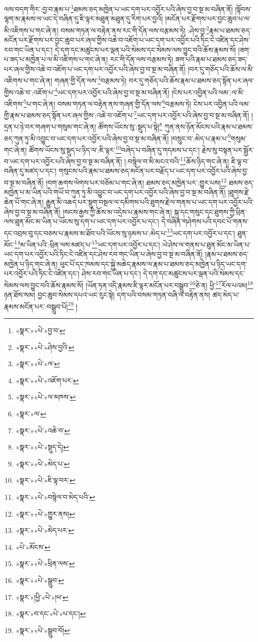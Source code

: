 ལས་བདག་གིར་:བྱ་བ་རྣམ་པ་\footnote{«སྣར་»«པེ་»བྱ་བ་}ཐམས་ཅད་མཁྱེན་པ་ཡང་དག་པར་འབྱོར་པའི་ཞེས་བྱ་བ་སྔ་མ་བཞིན་ནོ། །སྟོབས་ལྷག་མ་རྣམས་ལ་ཡང་དེ་བཞིན་དུ་ཇི་ལྟར་མཐུན་མཐུན་དུ་རིག་པར་བྱའོ། །མངོན་པར་རྫོགས་པར་བྱང་ཆུབ་པ་ལ་མི་འཇིགས་པ་གང་ཞེ་ན། བསམ་གཏན་ལ་བརྟེན་ནས་རང་གི་དོན་ལས་བརྩམས་ཏེ། :ཤེས་བྱ་\footnote{«སྣར་»«པེ་»ཤེས་བྱའི་}རྣམ་པ་ཐམས་ཅད་མངོན་པར་རྫོགས་པར་བྱང་ཆུབ་པར་ཞལ་གྱིས་འཆེ་བ་འཇོག་པ་ཡང་དག་པར་འབྱོར་པའི་ཏིང་ངེ་འཛིན་དང་ཤེས་རབ་གང་ཡིན་པ་དང་། དེ་དག་དང་མཚུངས་པར་ལྡན་པའི་སེམས་དང་སེམས་ལས་བྱུང་བའི་ཆོས་རྣམས་སོ། །ཟག་པ་ཟད་པ་མཁྱེན་པ་ལ་མི་འཇིགས་པ་གང་ཞེ་ན། རང་གི་དོན་ལས་བརྩམས་ཏེ། ཟག་པའི་རྣམ་པ་ཐམས་ཅད་ཟད་པར་ཞལ་གྱིས་འཆེ་བ་འཇོག་པ་ཡང་དག་པར་འབྱོར་པའི་ཞེས་བྱ་བ་སྔ་མ་བཞིན་ནོ། །བར་དུ་གཅོད་པའི་ཆོས་ལ་མི་འཇིགས་པ་གང་ཞེ་ན། གཞན་གྱི་དོན་ལས་\footnote{«སྣར་»«པེ་»ལ་}བརྩམས་ཏེ། བར་དུ་གཅོད་པའི་ཆོས་རྣམ་པ་ཐམས་ཅད་སྟོན་པར་ཞལ་གྱིས་འཆེ་བ་:འཇོག་པ་\footnote{«སྣར་»«པེ་»འཇོག་པར་}ཡང་དག་པར་འབྱོར་པའི་ཞེས་བྱ་བ་སྔ་མ་བཞིན་ནོ། །ངེས་པར་འབྱིན་པའི་ལམ་:ལ་མི་འཇིགས་\footnote{«སྣར་»«པེ་»ལ་མཁས་}པ་གང་ཞེ་ན། བསམ་གཏན་ལ་བརྟེན་ནས་གཞན་གྱི་དོན་ལས་\footnote{«སྣར་»ལ་}བརྩམས་ཏེ། ངེས་པར་འབྱིན་པའི་ལམ་གྱི་རྣམ་པ་ཐམས་ཅད་སྟོན་པར་ཞལ་གྱིས་:འཆེ་བ་འཇོག་པ་\footnote{«སྣར་»«པེ་»འཆེ་བ་}ཡང་དག་པར་འབྱོར་པའི་ཞེས་བྱ་བ་སྔ་མ་བཞིན་ནོ། །དྲན་པ་ཉེ་བར་གཞག་པ་གསུམ་གང་ཞེ་ན། ཚོགས་ཡོངས་སུ་:སྡུད་པ་སྟེ།\footnote{«སྣར་»«པེ་»སྡུད་དེ།} ཀུན་ནས་ཉོན་མོངས་པའི་རྣམ་པ་ཐམས་ཅད་ཀུན་ཏུ་མི་འབྱུང་བ་ཡང་དག་པར་འབྱོར་པའི་ཞེས་བྱ་བ་སྔ་མ་བཞིན་ནོ། །བསྲུང་བ་:མེད་པ་རྣམ་པ་\footnote{«སྣར་»«པེ་»མེད་པ་}གསུམ་གང་ཞེ་ན། ཚོགས་ཡོངས་སུ་སྡུད་པ་ཉིད་ལ་:ཇི་ལྟར་\footnote{«སྣར་»«པེ་»ཇི་ལྟ་བར་}བཞེད་པ་བཞིན་དུ་གདམས་པ་དང་། རྗེས་སུ་བསྟན་པར་སྦྱོར་བ་ཡང་དག་པར་འབྱོར་པའི་ཞེས་བྱ་བ་སྔ་མ་བཞིན་ནོ། །:བསྙེལ་བ་མི་མངའ་བའི་\footnote{«སྣར་»«པེ་»བསྙེལ་བ་མེད་པའི་}ཆོས་ཉིད་གང་ཞེ་ན། ཇི་ལྟ་བ་བཞིན་དུ་མཛད་པ་དང་། གསུངས་པའི་རྣམ་པ་ཐམས་ཅད་མངོན་པར་བརྗོད་པ་ཡང་དག་པར་འབྱོར་པའི་ཞེས་བྱ་བ་སྔ་མ་བཞིན་ནོ། །བག་ཆགས་ལེགས་པར་བཅོམ་པ་གང་ཞེ་ན། ཐམས་ཅད་མཁྱེན་པར་:གྱུར་པས།\footnote{«སྣར་»«པེ་»གྱུར་ནས།} ཐམས་ཅད་མཁྱེན་པ་མ་ཡིན་པའི་གཡོ་བ་ཀུན་ཏུ་མི་འབྱུང་བ་ཡང་དག་པར་འབྱོར་པའི་ཞེས་བྱ་བ་སྔ་མ་བཞིན་ནོ། །ཐུགས་རྗེ་ཆེན་པོ་གང་ཞེ་ན། རྒྱུན་མི་འཆད་པར་སྡུག་བསྔལ་ལ་དམིགས་པའི་ཐུགས་རྗེ་ལ་གནས་པ་ཡང་དག་པར་འབྱོར་པའི་ཞེས་བྱ་བ་སྔ་མ་བཞིན་ནོ། །སངས་རྒྱས་ཀྱི་ཆོས་མ་འདྲེས་པ་རྣམས་གང་ཞེ་ན། སྐུ་དང་གསུང་དང་ཐུགས་ཀྱི་ཕྲིན་ལས་ཐུན་མོང་མ་ཡིན་པ་ཡོངས་སུ་དག་པ་ཡང་དག་པར་འབྱོར་པ་དང་། དེ་བཞིན་གཤེགས་པའི་དབང་པོ་གནས་དང་འབྲས་བུ་དང་བཅས་པ་རྣམས་མ་ཐོབ་པའི་ཡོངས་སུ་ཉམས་པ་:མེད་པ་\footnote{«སྣར་»«པེ་»མེད་པར་}ཡང་དག་པར་འབྱོར་པ་དང་། ཐུན་མོང་\footnote{«པེ་»མོངས་}མ་ཡིན་པའི་:ཕྲིན་ལས་མཛད་པ་\footnote{«སྣར་»«པེ་»ཕྲིན་ལས་}ཡང་དག་པར་འབྱོར་པ་དང་། ཡེ་ཤེས་ལ་གནས་པ་ཐུན་མོང་མ་ཡིན་པ་ཡང་དག་པར་འབྱོར་པའི་ཏིང་ངེ་འཛིན་དང་ཤེས་རབ་གང་ཡིན་པ་ཞེས་བྱ་བ་སྔ་མ་བཞིན་ནོ། །རྣམ་པ་ཐམས་ཅད་མཁྱེན་པ་ཉིད་གང་ཞེ་ན། ཕུང་པོ་དང་ཁམས་དང་སྐྱེ་མཆེད་རྣམས་ལ་རྣམ་པ་ཐམས་ཅད་མཁྱེན་པ་ཉིད་ཡང་དག་པར་འབྱོར་པའི་ཏིང་ངེ་འཛིན་དང་། ཤེས་རབ་གང་ཡིན་པ་དང་། དེ་དག་དང་མཚུངས་པར་ལྡན་པའི་སེམས་དང་སེམས་ལས་བྱུང་བའི་ཆོས་རྣམས་སོ། །ཡོན་ཏན་འདི་རྣམས་ཇི་ལྟར་མངོན་པར་བསྒྲུབ་\footnote{«སྣར་»«པེ་»སྒྲུབ་}ཅེ་ན། ཕྱི་\footnote{«སྣར་»།ཕྱི་«པེ་»།ཕ་}རོལ་པའམ།\footnote{«སྣར་»བ་དང་«པེ་»པ་དང་།} ཉན་ཐོས་སམ། བྱང་ཆུབ་སེམས་དཔའ་ཡང་རུང་སྟེ། དག་པའི་བསམ་གཏན་བཞི་ལ་བརྟེན་ནས། ཚད་མེད་པ་རྣམས་མངོན་པར་:བསྒྲུབ་པོ།\footnote{«སྣར་»«པེ་»སྒྲུབ་བོ།} །
